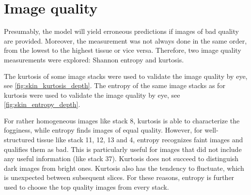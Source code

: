 
\section{Image quality}
Presumably, the model will yield erroneous predictions if images of bad quality are provided.
Moreover, the measurement was not always done in the same order, \ie from the lowest to the highest tissue or vice versa.
Therefore, two image quality measurements were explored: Shannon entropy and kurtosis.

The kurtosis of some image stacks were used to validate the image quality by eye, see \cref{fig:skin_kurtosis_depth}.
The entropy of the same image stacks as for kurtosis were used to validate the image quality by eye, see \cref{fig:skin_entropy_depth}.

For rather homogeneous images like stack 8, kurtosis is able to characterize the fogginess, while entropy finds images of equal quality.
However, for well-structured tissue like stack 11, 12, 13 and 4, entropy recognizes faint images and qualifies them as bad.
This is particularly useful for images that did not include any useful information (like stack 37).
Kurtosis does not succeed to distinguish dark images from bright ones.
Kurtosis also has the tendency to fluctuate, which is unexpected between subsequent slices.
For these reasons, entropy is further used to choose the top quality images from every stack.

